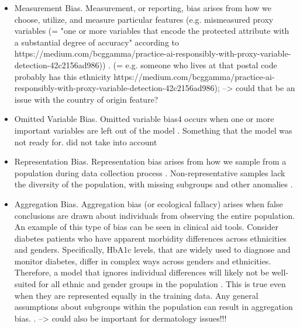 \documentclass[12pt, a4paper, oneside]{book}   	%
\begin{document}
			\begin{itemize}
				\item Measurement Bias. Measurement, or reporting, bias arises from how we choose, utilize, and measure particular features \autocite{M144_Suresh_2021} (e.g. mismeasured proxy variables (= "one or more variables that encode the protected attribute with a substantial degree of accuracy" according to https://medium.com/bcggamma/practice-ai-responsibly-with-proxy-variable-detection-42c2156ad986)) \autocite{Mehrabi_2021}. (= e.g. someone who lives at that postal code probably has this ethnicity https://medium.com/bcggamma/practice-ai-responsibly-with-proxy-variable-detection-42c2156ad986); --> could that be an issue with the country of origin feature?
				\item Omitted Variable Bias. Omitted variable bias4 occurs when one or more important variables are left out of the model \autocites{M38_Clarke_2005}{M131_Riegg_2008}\autocite{M114_Mustard_2003}. Something that the model was not ready for\autocite{Mehrabi_2021}. did not take into account
				\item Representation Bias. Representation bias arises from how we sample from a population during data collection process \autocite{M144_Suresh_2021}. Non-representative samples lack the diversity of the population, with missing subgroups and other anomalies \autocite{Mehrabi_2021}.
				\item Aggregation Bias. Aggregation bias (or ecological fallacy) arises when false conclusions are drawn about individuals from observing the entire population. An example of this type of bias can be seen in clinical aid tools. Consider diabetes patients who have apparent morbidity differences across ethnicities and genders. Specifically, HbA1c levels, that are widely used to diagnose and monitor diabetes, differ in complex ways across genders and ethnicities. Therefore, a model that ignores individual differences will likely not be well-suited for all ethnic and gender groups in the population \autocite{M144_Suresh_2021}. This is true even when they are represented equally in the training data. Any general assumptions about subgroups within the population can result in aggregation bias. \autocite{Mehrabi_2021}. --> could also be important for dermatology issues!!!
				\begin{itemize}

\end{itemize}
\end{itemize}
\end{document}
